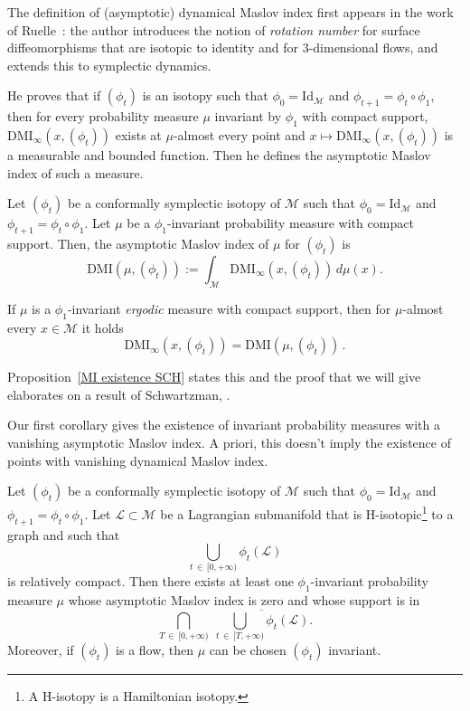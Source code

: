 \documentclass[AHL, Unicode, longabstracts, published]{cedram}
\newcommand*\M{\mathcal{M}}
\newcommand*\cl{\mathcal{L}}
\newcommand{\rId}{\mathrm{Id}}
\newcommand{\DMI}{\mathrm{DMI}}
\begin{document}
The definition of (asymptotic) dynamical Maslov index first appears in the work of Ruelle~\cite{Ruelle1985}: the author introduces the notion of \emph{rotation number} for surface diffeomorphisms { that are isotopic to identity} and for $3$-dimensional flows, and extends this to symplectic dynamics. {He proves that if $(\phi_t)$ is an isotopy such that $\phi_0=\rId_\M$ and $\phi_{t+1}=\phi_t\circ \phi_1$, then for every probability measure $\mu$ invariant by $\phi_1$ with compact support, $\DMI_\infty(x, (\phi_t))$ exists at $\mu$-almost every point and $x\mapsto \DMI_\infty(x, (\phi_t))$ is a measurable and bounded function. Then he defines the asymptotic Maslov index of such a measure.

\begin{defi}\label{def DMI infty measure}
Let $(\phi_t) $ be a conformally symplectic isotopy of $\M$ such that $\phi_0=\rId_\M$ and $\phi_{t+1}=\phi_t\circ\phi_1$. Let $\mu$ be a $\phi_1$-invariant probability measure with compact support. Then, the asymptotic Maslov index of $\mu$ for $(\phi_t) $ is
\[
\DMI(\mu, (\phi_t)):=\int_\M\DMI_\infty(x, (\phi_t))\, d\mu(x).
\]
\end{defi}

If $\mu$ is a $\phi_1$-invariant \emph{ergodic} measure with compact support, then for $\mu$-almost every $x\in\M$ it holds
\[
\DMI_\infty(x,(\phi_t))=\DMI(\mu,(\phi_t))\,.
\]


Proposition~\ref{MI existence SCH} states this and the proof that we will give elaborates on a result of Schwartzman, \cite{Schwartzman1957}.}



{Our first corollary gives the existence of invariant probability measures with a vanishing asymptotic Maslov index. A priori, this doesn't imply the existence of points with vanishing dynamical Maslov index.}

\begin{coro}\label{cormeasurebis}
Let $(\phi_t) $ be a conformally symplectic isotopy of $\M$ such that $\phi_0=\rId_\M$ and $\phi_{t+1}=\phi_t\circ\phi_1$. Let $\cl\subset \M $ be a Lagrangian submanifold that is {H-isotopic}\footnote{A H-isotopy is a Hamiltonian isotopy.} to a graph and such that
\[
\displaystyle{\bigcup_{t\,\in\,[0, +\infty)}\phi_t(\cl)}
\]
is relatively compact. Then there exists at least one $\phi_1$-invariant probability measure $\mu$ whose asymptotic Maslov index is zero and whose support is in
\[
\displaystyle{\bigcap_{T\,\in\,[0, +\infty)}\;\overline{\bigcup_{t\,\in\,[T, +\infty)}\phi_t(\cl)}}.
\]
Moreover, if $(\phi_t)$ is a flow, then $\mu$ can be chosen $(\phi_t)$ invariant.
\end{coro}
\end{document}

